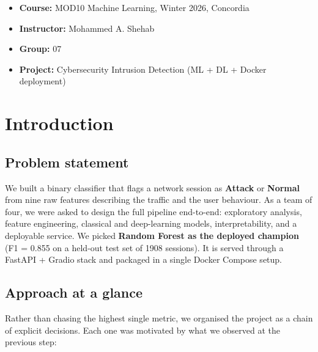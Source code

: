 \newpage

\begin{itemize}
\tightlist
\item
  \textbf{Course:} MOD10 Machine Learning, Winter 2026, Concordia
\item
  \textbf{Instructor:} Mohammed A. Shehab
\item
  \textbf{Group:} 07
\item
  \textbf{Project:} Cybersecurity Intrusion Detection (ML + DL + Docker
  deployment)
\end{itemize}

\section{Introduction}\label{introduction}

\subsection{Problem statement}\label{problem-statement}

We built a binary classifier that flags a network session as
\textbf{Attack} or \textbf{Normal} from nine raw features describing the
traffic and the user behaviour. As a team of four, we were asked to
design the full pipeline end-to-end: exploratory analysis, feature
engineering, classical and deep-learning models, interpretability, and a
deployable service. We picked \textbf{Random Forest as the deployed
champion} (F1 = 0.855 on a held-out test set of 1908 sessions). It is
served through a FastAPI + Gradio stack and packaged in a single Docker
Compose setup.

\subsection{Approach at a glance}\label{approach-at-a-glance}

Rather than chasing the highest single metric, we organised the project
as a chain of explicit decisions. Each one was motivated by what we
observed at the previous step:

